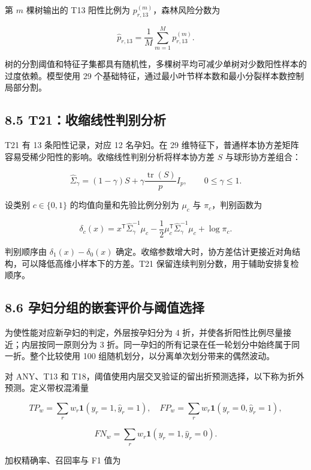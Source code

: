 \documentclass[UTF8,fontset=fandol,zihao=-4,a4paper]{ctexart}
\begin{document}
第 \(m\) 棵树输出的 T13 阳性比例为 \(p_{r,13}^{(m)}\)，森林风险分数为

\[
\widehat p_{r,13}
=\frac{1}{M}
\sum_{m=1}^{M}p_{r,13}^{(m)}.
\tag{57}
\]

树的分割阈值和特征子集都具有随机性，多棵树平均可减少单树对少数阳性样本的过度依赖。模型使用
29 个基础特征，通过最小叶节样本数和最小分裂样本数控制局部分割。

\subsection{8.5
T21：收缩线性判别分析}\label{t21ux6536ux7f29ux7ebfux6027ux5224ux522bux5206ux6790}

T21 有 13 条阳性记录，对应 12 名孕妇。在 29
维特征下，普通样本协方差矩阵容易受稀少阳性的影响。收缩线性判别分析将样本协方差
\(S\) 与球形协方差组合：

\[
\widehat\Sigma_{\gamma}
=(1-\gamma)S
+\gamma\frac{\operatorname{tr}(S)}{p}I_p,
\qquad 0\le\gamma\le1.
\tag{58}
\]

设类别 \(c\in\{0,1\}\) 的均值向量和先验比例分别为 \(\mu_c\) 与
\(\pi_c\)，判别函数为

\[
\delta_c(x)
=x^{\mathsf T}\widehat\Sigma_{\gamma}^{-1}\mu_c
-\frac12\mu_c^{\mathsf T}
\widehat\Sigma_{\gamma}^{-1}\mu_c
+\log\pi_c.
\tag{59}
\]

判别顺序由 \(\delta_1(x)-\delta_0(x)\)
确定。收缩参数增大时，协方差估计更接近对角结构，可以降低高维小样本下的方差。T21
保留连续判别分数，用于辅助安排复检顺序。

\subsection{8.6
孕妇分组的嵌套评价与阈值选择}\label{ux5b55ux5987ux5206ux7ec4ux7684ux5d4cux5957ux8bc4ux4ef7ux4e0eux9608ux503cux9009ux62e9}

为使性能对应新孕妇的判定，外层按孕妇分为 4
折，并使各折阳性比例尽量接近；内层按同一原则分为 3
折。同一孕妇的所有记录在任一轮划分中始终属于同一折。整个比较使用 100
组随机划分，以分离单次划分带来的偶然波动。

对 ANY、T13 和
T18，阈值使用内层交叉验证的留出折预测选择，以下称为折外预测。定义带权混淆量

\[
TP_w=\sum_r w_r\mathbf1(y_r=1,\widehat y_r=1),
\quad
FP_w=\sum_r w_r\mathbf1(y_r=0,\widehat y_r=1),
\tag{60}
\]

\[
FN_w=\sum_r w_r\mathbf1(y_r=1,\widehat y_r=0).
\tag{61}
\]

加权精确率、召回率与 F1 值为
\end{document}
